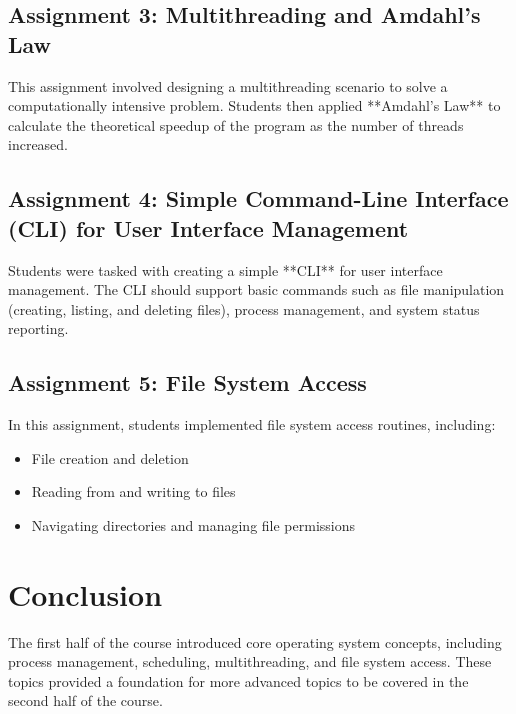 \documentclass[12pt]{article}
\begin{document}
\subsection{Assignment 3: Multithreading and Amdahl's Law}
This assignment involved designing a multithreading scenario to solve a computationally intensive problem. Students then applied **Amdahl's Law** to calculate the theoretical speedup of the program as the number of threads increased.

\subsection{Assignment 4: Simple Command-Line Interface (CLI) for User Interface Management}
Students were tasked with creating a simple **CLI** for user interface management. The CLI should support basic commands such as file manipulation (creating, listing, and deleting files), process management, and system status reporting.

\subsection{Assignment 5: File System Access}
In this assignment, students implemented file system access routines, including:
\begin{itemize}
    \item File creation and deletion
    \item Reading from and writing to files
    \item Navigating directories and managing file permissions
\end{itemize}

\section{Conclusion}
The first half of the course introduced core operating system concepts, including process management, scheduling, multithreading, and file system access. These topics provided a foundation for more advanced topics to be covered in the second half of the course.
\end{document}
